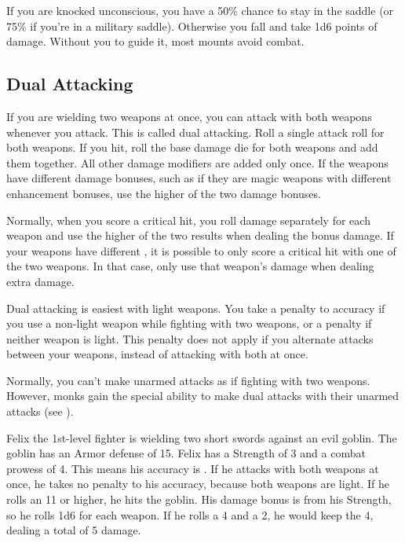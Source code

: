          If you are knocked unconscious, you have a 50\% chance to stay in the saddle (or 75\% if you're in a military saddle). Otherwise you fall and take 1d6 points of damage. Without you to guide it, most mounts avoid combat.

    \subsection{Dual Attacking}\label{Dual Attacking}
        If you are wielding two weapons at once, you can attack with both weapons whenever you attack. This is called dual attacking. Roll a single attack roll for both weapons. If you hit, roll the base damage die for both weapons and add them together. All other damage modifiers are added only once. If the weapons have different damage bonuses, such as if they are magic weapons with different enhancement bonuses, use the higher of the two damage bonuses.

         Normally, when you score a critical hit, you roll damage separately for each weapon and use the higher of the two results when dealing the bonus damage. If your weapons have different , it is possible to only score a critical hit with one of the two weapons. In that case, only use that weapon's damage when dealing extra damage.

         Dual attacking is easiest with light weapons. You take a  penalty to accuracy if you use a non-light weapon while fighting with two weapons, or a  penalty if neither weapon is light. This penalty does not apply if you alternate attacks between your weapons, instead of attacking with both at once.

         Normally, you can't make unarmed attacks as if fighting with two weapons. However, monks gain the special ability to make dual attacks with their unarmed attacks (see ).

         Felix the 1st-level fighter is wielding two short swords against an evil goblin. The goblin has an Armor defense of 15. Felix has a Strength of 3 and a combat prowess of 4. This means his accuracy is . If he attacks with both weapons at once, he takes no penalty to his accuracy, because both weapons are light. If he rolls an 11 or higher, he hits the goblin. His damage bonus is  from his Strength, so he rolls 1d6 for each weapon. If he rolls a 4 and a 2, he would keep the 4, dealing a total of 5 damage.

